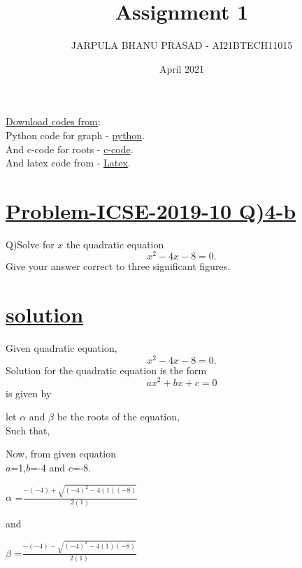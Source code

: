 \documentclass[journal,12pt,twocolumn]{IEEEtran}
\title{Assignment 1}
\author{JARPULA BHANU PRASAD - AI21BTECH11015	}
\date{April 2021}
\begin{document}
\maketitle
\Large \underline{Download codes from}:\\
\large Python code for graph - \href{https://github.com/jarpula-Bhanu/Assinment-1/blob/main/quardratic.py}{python}.\\And c-code for roots -  \href{https://github.com/jarpula-Bhanu/Assinment-1/blob/main/roots.c}{c-code}.\\And latex code from - \href{}{Latex}.

\section{\Large \underline{Problem-ICSE-2019-10  Q)4-b}}
\large \noindent Q)Solve for $x$ the quadratic equation $$x^2-4x-8=0.$$ Give your answer correct to three significant figures.
\section{\large \underline{solution}}
Given quadratic equation,
\large $$x^2-4x-8=0.$$
Solution for the quadratic equation is the form  \large $$ax^2+bx+c=0$$ is given by 
\begin{center}
\end{center}

let $\alpha$ and $\beta$ be the roots of the equation,\\Such that,
\begin{center}
\end{center}

Now, from given equation \\$a$=1,$b$=-4 and $c$=-8.
\begin{center}
$\alpha$ =\Large $\frac{-(-4)+\sqrt{(-4)^2-4(1)(-8)}}{2(1)}$
\end{center}
and
\begin{center}
$\beta$ =\Large $\frac{-(-4)-\sqrt{(-4)^2-4(1)(-8)}}{2(1)}$
\end{center}
\end{document}
